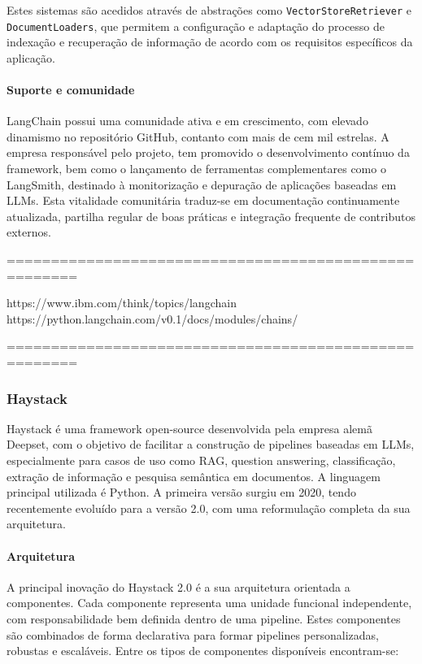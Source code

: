 Estes sistemas são acedidos através de abstrações como \texttt{VectorStoreRetriever} e \texttt{DocumentLoaders}, que permitem a configuração e adaptação do processo de indexação e recuperação de informação de acordo com os requisitos específicos da aplicação.

\paragraph{Suporte e comunidade}

LangChain possui uma comunidade ativa e em crescimento, com elevado dinamismo no repositório GitHub, contanto com mais de cem mil estrelas. A empresa responsável pelo projeto, tem promovido o desenvolvimento contínuo da framework, bem como o lançamento de ferramentas complementares como o LangSmith, destinado à monitorização e depuração de aplicações baseadas em LLMs. Esta vitalidade comunitária traduz-se em documentação continuamente atualizada, partilha regular de boas práticas e integração frequente de contributos externos.


======================================================

https://www.ibm.com/think/topics/langchain
https://python.langchain.com/v0.1/docs/modules/chains/


======================================================



\subsubsection{Haystack}


Haystack é uma framework open-source desenvolvida pela empresa alemã Deepset, com o objetivo de facilitar a construção de pipelines baseadas em LLMs, especialmente para casos de uso como RAG, question answering, classificação, extração de informação e pesquisa semântica em documentos. A linguagem principal utilizada é Python. A primeira versão surgiu em 2020, tendo recentemente evoluído para a versão 2.0, com uma reformulação completa da sua arquitetura.

\paragraph{Arquitetura}

A principal inovação do Haystack 2.0 é a sua arquitetura orientada a componentes. Cada componente representa uma unidade funcional independente, com responsabilidade bem definida dentro de uma pipeline. Estes componentes são combinados de forma declarativa para formar pipelines personalizadas, robustas e escaláveis. Entre os tipos de componentes disponíveis encontram-se:

